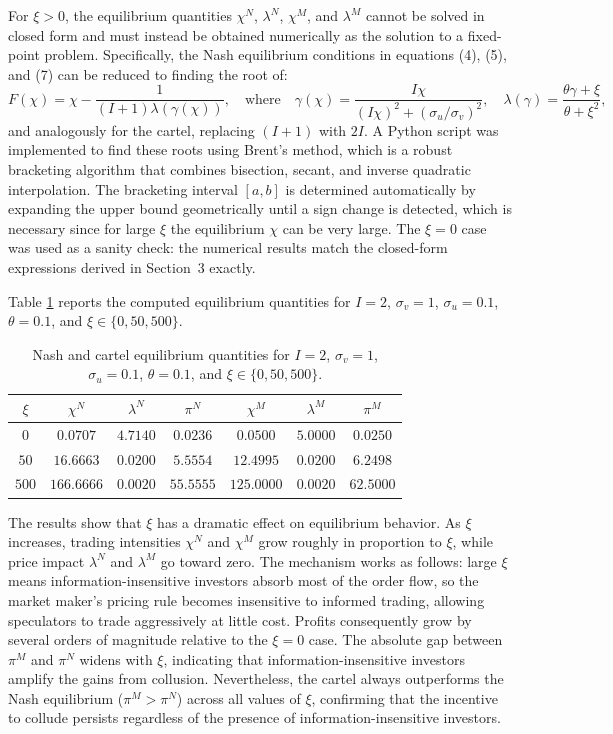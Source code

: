 \documentclass[11pt]{article}
\begin{document}
For $\xi > 0$, the equilibrium quantities $\chi^N$, $\lambda^N$, $\chi^M$, and $\lambda^M$ 
cannot be solved in closed form\label{par:numerical_solver} and must instead be obtained numerically as the solution 
to a fixed-point problem. Specifically, the Nash equilibrium conditions in equations (4), (5), and (7) can be reduced to 
finding the root of:
\[
F(\chi) = \chi - \frac{1}{(I+1)\lambda(\gamma(\chi))}, \quad \text{where} \quad 
\gamma(\chi) = \frac{I\chi}{(I\chi)^2 + (\sigma_u/\sigma_v)^2}, \quad 
\lambda(\gamma) = \frac{\theta\gamma + \xi}{\theta + \xi^2},
\]
and analogously for the cartel, replacing $(I+1)$ with $2I$. A Python script was 
implemented to find these roots using Brent's method, which is a robust bracketing 
algorithm that combines bisection, secant, and inverse quadratic interpolation. The 
bracketing interval $[a, b]$ is determined automatically by expanding the upper bound 
geometrically until a sign change is detected, which is necessary since for large $\xi$ 
the equilibrium $\chi$ can be very large. The $\xi = 0$ case was used as a sanity check: 
the numerical results match the closed-form expressions derived in Section~3 exactly.

Table \ref{tab:numerical} reports the computed equilibrium quantities for $I=2$, 
$\sigma_v=1$, $\sigma_u=0.1$, $\theta=0.1$, and $\xi \in \{0, 50, 500\}$.

\begin{table}[H]
\centering
\begin{tabular}{ccccccc}
\toprule
$\xi$ & $\chi^N$ & $\lambda^N$ & $\pi^N$ & $\chi^M$ & $\lambda^M$ & $\pi^M$ \\
\midrule
$0$   & $0.0707$ & $4.7140$ & $0.0236$ & $0.0500$ & $5.0000$ & $0.0250$ \\
$50$  & $16.6663$ & $0.0200$ & $5.5554$ & $12.4995$ & $0.0200$ & $6.2498$ \\
$500$ & $166.6666$ & $0.0020$ & $55.5555$ & $125.0000$ & $0.0020$ & $62.5000$ \\
\bottomrule
\end{tabular}
\caption{Nash and cartel equilibrium quantities for $I=2$, $\sigma_v=1$, 
$\sigma_u=0.1$, $\theta=0.1$, and $\xi \in \{0, 50, 500\}$.}
\label{tab:numerical}
\end{table}

The results show that $\xi$ has a dramatic effect on equilibrium behavior. 
As $\xi$ increases, trading intensities $\chi^N$ and $\chi^M$ grow roughly in 
proportion to $\xi$, while price impact $\lambda^N$ and $\lambda^M$ go toward 
zero. The mechanism works as follows: large $\xi$ means information-insensitive 
investors absorb most of the order flow, so the market maker's pricing rule becomes insensitive to informed trading, allowing speculators to trade aggressively at little cost. Profits consequently grow by several orders of magnitude relative 
to the $\xi=0$ case. The absolute gap between $\pi^M$ and $\pi^N$ widens with $\xi$, 
indicating that information-insensitive investors amplify the gains from collusion. 
Nevertheless, the cartel always outperforms the Nash equilibrium ($\pi^M > \pi^N$) 
across all values of $\xi$, confirming that the incentive to collude persists 
regardless of the presence of information-insensitive investors.
\end{document}
